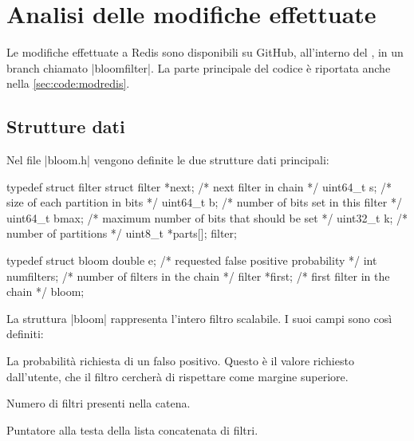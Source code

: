 \section{Analisi delle modifiche effettuate}
\label{sec:patchexplain}

Le modifiche effettuate a Redis sono disponibili su GitHub, all'interno del
, in un branch
chiamato \cverb|bloomfilter|. La parte principale del codice è riportata anche
nella \autoref{sec:code:modredis}.

\subsection{Strutture dati}

Nel file \cverb|bloom.h| vengono definite le due strutture dati principali:

\begin{commentedsource}[style=csource,caption=Strutture dati,label={lst:bloomStruct}]
typedef struct filter {
    struct filter *next;  /* next filter in chain */
    uint64_t s;           /* size of each partition in bits */
    uint64_t b;           /* number of bits set in this filter */
    uint64_t bmax;        /* maximum number of bits that should be set */
    uint32_t k;           /* number of partitions */
    uint8_t *parts[];
} filter;

typedef struct bloom {
	double e;             /* requested false positive probability */
	int numfilters;       /* number of filters in the chain */
	filter *first;        /* first filter in the chain */
} bloom;
\end{commentedsource}

La struttura \cverb|bloom| rappresenta l'intero filtro scalabile. I suoi campi sono
così definiti:

\begin{description}[labelindent=2\parindent,leftmargin=!,labelwidth=8em,font={\bfseries\ttfamily}]
  \item[double e] La probabilità richiesta di un falso positivo. Questo è il valore richiesto
      dall'utente, che il filtro cercherà di rispettare come margine superiore.
  \item[int numfilters] Numero di filtri presenti nella catena.
  \item[filter *first] Puntatore alla testa della lista concatenata di filtri.
\end{description}

